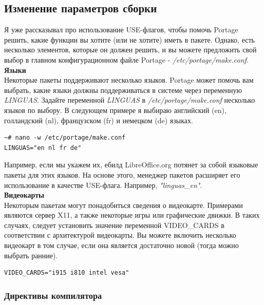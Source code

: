 \documentclass[10pt]{book}
\begin{document}
\subsection{Изменение параметров сборки}

Я уже рассказывал про использование USE-флагов, чтобы помочь Portage решить, какие функции вы хотите  (или не хотите) иметь в пакете. Однако, есть несколько элементов, которые он должен решить, и вы можете предложить свой выбор в  главном конфигурационном файле Portage - \textit{/etc/portage/make.conf}.\\

\textbf{Языки}\\

Некоторые пакеты поддерживают несколько языков. Portage может помочь вам выбрать, какие языки должны поддерживаться в системе через переменную \textit{LINGUAS}. Задайте переменной \textit{LINGUAS} в \textit{/etc/portage/make.conf} несколько языков по выбору. В следующем примере я выбираю английский (en), голландский (nl), французском (fr) и немецком (de) языках.

\begin{tcolorbox}
\begin{lstlisting}
~# nano -w /etc/portage/make.conf
LINGUAS="en nl fr de"
\end{lstlisting}
\end{tcolorbox}

Например, если мы укажем их, ебилд LibreOffice.org потянет за собой языковые пакеты для этих языков.
На основе этого, менеджер пакетов расширяет его использование в качестве USE-флага. Например, \textit{"linguas\_en"}.\\

\textbf{Видеокарты}\\

Некоторым пакетам могут понадобиться сведения о видеокарте. Примерами являются сервер X11, а также некоторые игры или графические движки. В таких случаях, следует установить значение переменной VIDEO\_CARDS в соответствии с архитектурой видеокарты. Вы можете включить несколько видеокарт в том случае, если она является достаточно новой (тогда можно выбрать ранние).

\begin{tcolorbox}
\begin{lstlisting}
VIDEO_CARDS="i915 i810 intel vesa"
\end{lstlisting}
\end{tcolorbox}

\subsubsection{Директивы компилятора}
\end{document}
